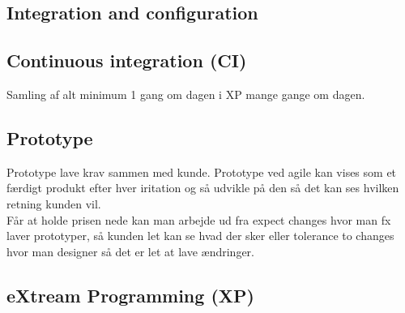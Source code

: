 \documentclass[11pt,a4paper]{article}
\begin{document}
\subsection{Integration and configuration}
\subsection{Continuous integration (CI)}
Samling af alt minimum 1 gang om dagen i XP mange gange om dagen.
\subsection{Prototype}
Prototype lave krav sammen med kunde. Prototype ved agile kan vises som et færdigt produkt efter hver iritation og så udvikle på den så det kan ses hvilken retning kunden vil.\\
Får at holde prisen nede kan man arbejde ud fra expect changes hvor man fx laver prototyper, så kunden let kan se hvad der sker eller tolerance to changes hvor man designer så det er let at lave ændringer.
\subsection{eXtream Programming (XP)}
\end{document}
